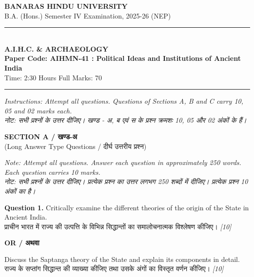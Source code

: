 \documentclass[11pt,a4paper]{article}
\newcommand{\pts}[1]{\hfill \textit{[#1]}}
\begin{document}
\begin{center}
  {\large\bfseries BANARAS HINDU UNIVERSITY}\\[2pt]
  {\normalsize B.A. (Hons.) Semester IV Examination, 2025-26 (NEP)}\\[6pt]
  \rule{0.8\linewidth}{0.5pt}\\[6pt]
  {\large\bfseries A.I.H.C. \& ARCHAEOLOGY}\\[4pt]
  {\large\bfseries Paper Code: AIHMN-41 : Political Ideas and Institutions of Ancient India}\\[4pt]
  {\normalsize Time: 2:30 Hours \hfill Full Marks: 70}
\end{center}

\rule{\linewidth}{0.4pt}

\smallskip

\noindent \textit{Instructions: Attempt all questions. Questions of Sections A, B and C carry 10, 05 and 02 marks each.}\\[2pt]
\noindent \textit{नोट: सभी प्रश्नों के उत्तर दीजिए। खण्ड - अ, ब एवं स के प्रश्न क्रमशः 10, 05 और 02 अंकों के हैं।}

\bigskip

\begin{center}
  {\large\bfseries SECTION A / खण्ड-अ}\\[2pt]
  {\normalsize (Long Answer Type Questions / दीर्घ उत्तरीय प्रश्न)}
\end{center}

\noindent \textit{Note: Attempt all questions. Answer each question in approximately 250 words. Each question carries 10 marks.}\\[2pt]
\noindent \textit{नोट: सभी प्रश्नों के उत्तर दीजिए। प्रत्येक प्रश्न का उत्तर लगभग 250 शब्दों में दीजिए। प्रत्येक प्रश्न 10 अंकों का है।}

\bigskip

\noindent \textbf{Question 1.} Critically examine the different theories of the origin of the State in Ancient India.\\[1pt]
प्राचीन भारत में राज्य की उत्पत्ति के विभिन्न सिद्धान्तों का समालोचनात्मक विश्लेषण कीजिए। \pts{10}

\begin{center}
  \textbf{OR / अथवा}
\end{center}

\noindent Discuss the Saptanga theory of the State and explain its components in detail.\\[1pt]
राज्य के सप्तांग सिद्धान्त की व्याख्या कीजिए तथा उसके अंगों का विस्तृत वर्णन कीजिए। \pts{10}
\end{document}
